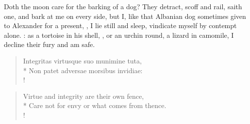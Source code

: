 {Doth the moon care for the barking of a dog? They detract, scoff and rail, saith one, and bark at me on every side, but I, like that Albanian dog sometimes given to Alexander for a present, , I lie still and sleep, vindicate myself by contempt alone. : as a tortoise in his shell, , or an urchin round,  a lizard in camomile, I decline their fury and am safe.

\begin{latin}%
\begin{verse}%
Integritas virtusque suo munimine tuta,\\*
Non patet adversae morsibus invidiae:\\!
\end{verse}%
\end{latin}%
\translationrule%
\begin{verse}%
Virtue and integrity are their own fence,\\*
Care not for envy or what comes from thence.\\!
\end{verse}%

}
